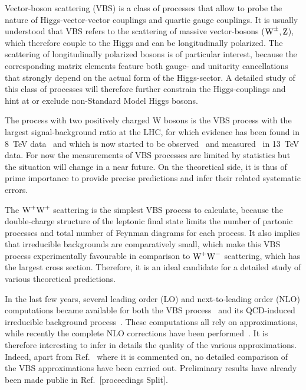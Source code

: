 Vector-boson scattering (VBS) is a class of processes that allow to probe the nature of Higgs-vector-vector couplings and quartic gauge couplings.
It is usually understood that VBS refers to the scattering of massive vector-bosons ($\text{W}^\pm,\text{Z}$), which therefore couple to the Higgs and can be longitudinally polarized.
The scattering of longitudinally polarized bosons is of particular interest, because the corresponding matrix elements feature both gauge- and unitarity cancellations that strongly depend on the actual form of the Higgs-sector.
A detailed study of this class of processes will therefore further constrain the Higgs-couplings and hint at or exclude non-Standard Model Higgs bosons.

The process with two positively charged W bosons is the VBS process with the largest signal-background ratio at the LHC, for which evidence has been found in \SI{8}{\tera\electronvolt} data~\cite{Aad:2014zda,Khachatryan:2014sta} and which is now started to be observed~\cite{Sirunyan:2017ret} and measured~\cite{Aaboud:2016ffv} in \SI{13}{\tera\electronvolt} data.
For now the measurements of VBS processes are limited by statistics but the situation will change in a near future.
On the theoretical side, it is thus of prime importance to provide precise predictions and infer their related systematic errors.

The $\text{W}^+\text{W}^+$ scattering is the simplest VBS process to calculate, because the double-charge structure of the leptonic final state limits the number of partonic processes and total number of Feynman diagrams for each process.
It also implies that irreducible backgrounds are comparatively small, which make this VBS process experimentally favourable in comparison to \eg $\text{W}^+\text{W}^-$ scattering, which has the largest cross section.
Therefore, it is an ideal candidate for a detailed study of various theoretical predictions.

In the last few years, several leading order (LO) and next-to-leading order (NLO) computations became available for both the VBS process~\cite{Jager:2009xx,Jager:2011ms,Denner:2012dz,Rauch:2016pai} and its QCD-induced irreducible background process~\cite{Rauch:2016pai,Melia:2010bm,Melia:2011gk,Campanario:2013gea,Baglio:2014uba}.
These computations all rely on approximations, while recently the complete NLO corrections have been performed~\cite{Biedermann:2017bss}.
It is therefore interesting to infer in details the quality of the various approximations.
Indeed, apart from Ref.~\cite{Biedermann:2017bss} where it is commented on,  no detailed comparison of the VBS approximations have been carried out.
Preliminary results have already been made public in Ref.~[proceedings Split].

